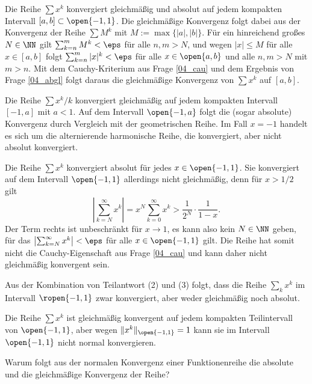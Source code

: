 \begin{antwort}
 Die Reihe $\sum  x^k$ konvergiert 
gleichmäßig und absolut auf jedem kompakten Intervall 
$[a,b]\subset \open{-1,1}$.  
Die gleichmäßige Konvergenz folgt dabei aus der Konvergenz der 
Reihe $\sum M^k$ mit $M:=\max\{|a|,|b|\}$. Für ein hinreichend 
großes $N\in\NN$ gilt $\sum_{k=n}^m M^k < \eps$ für alle $n,m>N$, 
und wegen $|x| \le M$ für alle $x\in [a,b]$ folgt $\sum_{k=n}^m |x|^k < \eps$ 
für alle $x\in \open{a,b}$ und alle $n,m>N$ mit $m>n$. 
Mit dem Cauchy-Kriterium aus Frage \ref{04_cau} 
und dem Ergebnis von Frage \ref{04_abgl} folgt daraus die 
gleichmäßige Konvergenz von $\sum x^k$ auf $[a,b]$. 

\medskip
\noindent
{} Die Reihe $\sum x^k/k$ konvergiert gleichmäßig auf jedem 
kompakten Intervall $[-1,a]$ mit $a<1$. Auf dem Intervall $\open{-1,a}$ 
folgt die (sogar absolute) Konvergenz durch Vergleich mit 
der geometrischen Reihe. Im Fall $x=-1$ handelt es sich um die alternierende 
harmonische Reihe, die konvergiert, aber nicht absolut konvergiert. 

\medskip
\noindent
{} Die Reihe $\sum x^k$ konvergiert absolut für jedes 
$x\in \open{-1,1}$. 
Sie konvergiert auf dem Intervall $\open{-1,1}$ 
allerdings nicht gleichmäßig, denn für $x>1/2$ gilt 
\[
\left| \sum_{k=N}^\infty x^k \right|  =  
x^N \sum_{k=0}^\infty x^k > \frac{1}{2^N}\cdot \frac{1}{1-x}. 
\]  
Der Term rechts ist unbeschränkt für $x\to 1$, es kann also kein 
$N\in\NN$ geben, für das $\left|\sum_{k=N}^\infty x^k\right|< \eps$ 
für alle $x\in \open{-1,1}$ gilt. Die Reihe hat somit nicht die 
Cauchy-Eigenschaft aus Frage \ref{04_cau} und kann daher nicht 
gleichmäßig konvergent sein.

\medskip
\noindent
{} 
Aus der Kombination von Teilantwort (2) und (3) folgt, 
dass die Reihe $\sum_k x^k$ im Intervall $\ropen{-1,1}$ zwar konvergiert, 
aber weder gleichmäßig noch absolut. 

\medskip
\noindent
{} Die Reihe $\sum x^k$ ist gleichmäßig konvergent auf 
jedem kompakten Teilintervall von $\open{-1,1}$, aber wegen 
$\| x^k \|_{\open{-1,1}} = 1$ kann sie im Intervall $\open{-1,1}$ 
nicht normal konvergieren.
\AntEnd
  
 
\end{antwort}
\begin{frage}\label{04_norm}
Warum folgt aus der normalen Konvergenz einer Funktionenreihe die 
absolute und die gleichmäßige Konvergenz der Reihe?
\end{frage}

